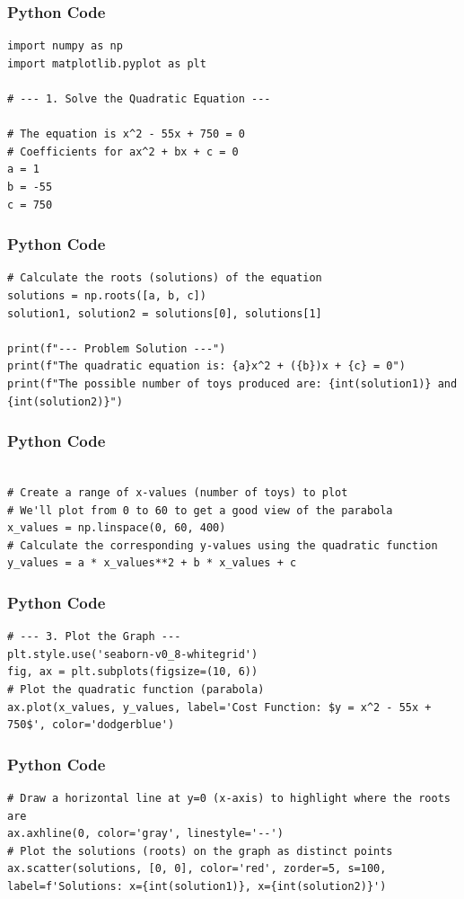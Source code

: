 \documentclass{beamer}
\begin{document}
\begin{frame}[fragile]
\frametitle{Python Code}
\begin{lstlisting}
import numpy as np
import matplotlib.pyplot as plt

# --- 1. Solve the Quadratic Equation ---

# The equation is x^2 - 55x + 750 = 0
# Coefficients for ax^2 + bx + c = 0
a = 1
b = -55
c = 750
\end{lstlisting}
\end{frame}

\begin{frame}[fragile]
\frametitle{Python Code}
\begin{lstlisting}
# Calculate the roots (solutions) of the equation
solutions = np.roots([a, b, c])
solution1, solution2 = solutions[0], solutions[1]

print(f"--- Problem Solution ---")
print(f"The quadratic equation is: {a}x^2 + ({b})x + {c} = 0")
print(f"The possible number of toys produced are: {int(solution1)} and {int(solution2)}")
\end{lstlisting}
\end{frame}

\begin{frame}[fragile]
\frametitle{Python Code}
\begin{lstlisting}

# Create a range of x-values (number of toys) to plot
# We'll plot from 0 to 60 to get a good view of the parabola
x_values = np.linspace(0, 60, 400)
# Calculate the corresponding y-values using the quadratic function
y_values = a * x_values**2 + b * x_values + c
\end{lstlisting}
\end{frame}

\begin{frame}[fragile]
\frametitle{Python Code}
\begin{lstlisting}
# --- 3. Plot the Graph ---
plt.style.use('seaborn-v0_8-whitegrid')
fig, ax = plt.subplots(figsize=(10, 6))
# Plot the quadratic function (parabola)
ax.plot(x_values, y_values, label='Cost Function: $y = x^2 - 55x + 750$', color='dodgerblue')
\end{lstlisting}
\end{frame}

\begin{frame}[fragile]
\frametitle{Python Code}
\begin{lstlisting}
# Draw a horizontal line at y=0 (x-axis) to highlight where the roots are
ax.axhline(0, color='gray', linestyle='--')
# Plot the solutions (roots) on the graph as distinct points
ax.scatter(solutions, [0, 0], color='red', zorder=5, s=100, label=f'Solutions: x={int(solution1)}, x={int(solution2)}')
\end{lstlisting}
\end{frame}
\end{document}

